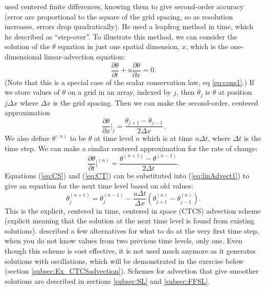 \citet{Rich22} used centered finite differences, knowing them to
give second-order accuracy (error are proportional to the square of
the grid spacing, so as resolution increases, errors drop quadratically).
He used a leapfrog method in time, which he described as ``step-over''.
To illustrate this method, we can consider the solution of the $\theta$
equation in just one spatial dimension, $x$, which is the one-dimensional
linear-advection equation:
\begin{equation}
\frac{\partial\theta}{\partial t}+u\frac{\partial\theta}{\partial x}=0.\label{eq:linAdvect1}
\end{equation}
(Note that this is a special case of the scalar conservation law, eq \ref{eq:cons1}.)
If we store values of $\theta$ on a grid in an array, indexed by
$j$, then $\theta_{j}$ is $\theta$ at position $j\Delta x$ where
$\Delta x$ is the grid spacing. Then we can make the second-order,
centered approximation
\begin{equation}
\frac{\partial\theta}{\partial x}\bigg|_{j}=\frac{\theta_{j+1}-\theta_{j-1}}{2\Delta x}.\label{eq:CS}
\end{equation}
We also define $\theta^{(n)}$ to be $\theta$ at time level $n$
which is at time $n\Delta t$, where $\Delta t$ is the time step.
We can make a similar centered approximation for the rate of change:
\begin{equation}
\frac{\partial\theta}{\partial t}\bigg|^{(n)}=\frac{\theta^{(n+1)}-\theta^{(n-1)}}{2\Delta t}.\label{eq:CT}
\end{equation}
Equations (\ref{eq:CS}) and (\ref{eq:CT}) can be substituted into
(\ref{eq:linAdvect1}) to give an equation for the next time level
based on old values:
\begin{equation}
\theta_{j}^{(n+1)}=\theta_{j}^{(n-1)}-\frac{u\Delta t}{\Delta x}\left(\theta_{j+1}^{(n)}-\theta_{j-1}^{(n)}\right).\label{eq:CTCSadvect}
\end{equation}
This is the explicit, centered in time, centered in space (CTCS) advection
scheme (explicit meaning that the solution at the next time level
is found from existing solutions). \citet{Rich22} described a few
alternatives for what to do at the very first time step, when you
do not know values from two previous time levels, only one. Even though
this scheme is cost effective, it is not used much anymore as it generates
solutions with oscillations, which will be demonstrated in the exercise
below (section \ref{subsec:Ex_CTCSadvection}). Schemes for advection
that give smoother solutions are described in sections \ref{subsec:SL}
and \ref{subsec:FFSL}.

